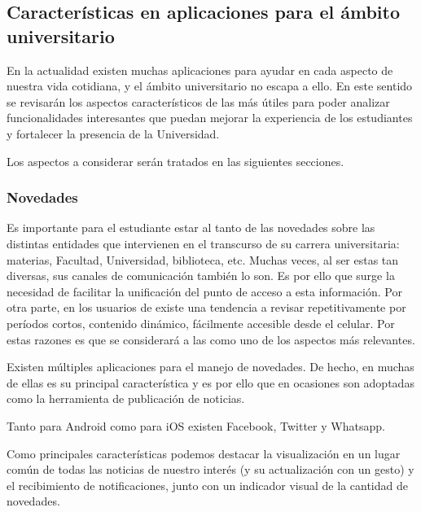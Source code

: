 \subsection{Características en aplicaciones para el ámbito universitario}
\label{aplicaciones_utiles_existentes}

En la actualidad existen muchas aplicaciones para ayudar en cada aspecto de
nuestra vida cotidiana, y el ámbito universitario no escapa a ello. En este sentido se
revisarán los aspectos característicos de las más útiles\cite{StudentApps} para poder analizar funcionalidades interesantes que puedan mejorar la experiencia de los estudiantes y fortalecer la presencia de la Universidad.

Los aspectos a considerar serán tratados en las siguientes secciones.

\subsubsection{Novedades}
\label{aplicaciones_utiles_existentes_novedades}

Es importante para el estudiante estar al tanto de las novedades sobre las distintas entidades que intervienen en el transcurso de su carrera universitaria: materias, Facultad, Universidad, biblioteca, etc.
Muchas veces, al ser estas tan diversas, sus canales de comunicación también lo son.
Es por ello que surge la necesidad de facilitar la unificación del punto de acceso a esta información.
Por otra parte, en los usuarios de  existe una tendencia a revisar repetitivamente por períodos cortos, contenido dinámico, fácilmente accesible desde el celular\cite{oulasvirta2012habits}. Por estas razones es que se considerará a las  como uno de los aspectos más relevantes.

Existen múltiples aplicaciones para el manejo de novedades. De hecho, en muchas de ellas es su principal característica y es por ello que en ocasiones son adoptadas como la herramienta de publicación de noticias.

Tanto para Android como para iOS existen Facebook, Twitter y Whatsapp.


Como principales características podemos destacar la visualización en un lugar común de todas las noticias de nuestro interés (y su actualización con un gesto) y el recibimiento de notificaciones, junto con un indicador visual de la cantidad de novedades.

